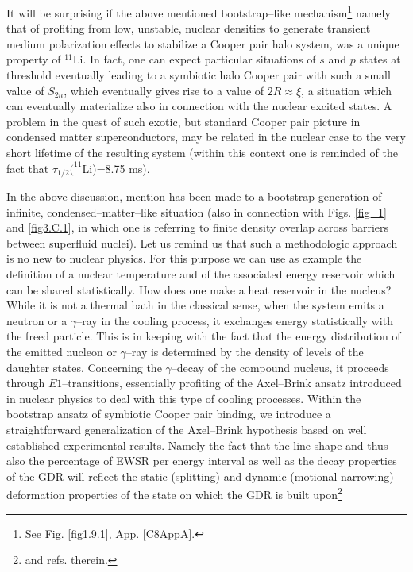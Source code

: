 It will be surprising if the above mentioned  bootstrap--like mechanism\footnote{See Fig. \ref{fig1.9.1}, App. \ref{C8AppA}.}  namely that of profiting from  low, unstable, nuclear densities to generate transient medium polarization effects to stabilize a Cooper pair halo system, was a unique property of $^{11}$Li. In fact, one can expect particular situations of $s$ and $p$ states at threshold eventually leading to a symbiotic halo Cooper pair with such a small value of $S_{2n}$, which  eventually gives rise to a value of $2R\approx\xi$, a situation which can eventually materialize also in connection with the nuclear excited states. A problem in the quest of such exotic, but standard Cooper pair picture in condensed matter superconductors, may be related in the nuclear case to the very short lifetime of the resulting system (within this context one is reminded of the fact that $\tau_{1/2}(^{11}$Li)=8.75 ms).


In the above discussion, mention has been made to a bootstrap generation of infinite, condensed--matter--like situation (also  in connection with Figs. \ref{fig_1} and \ref{fig3.C.1}, in which one is referring to finite density overlap across barriers between superfluid nuclei). Let us remind us that such a methodologic approach is no new to nuclear physics. For this purpose we can use as example the definition of a nuclear temperature and of the associated energy reservoir which can be shared statistically. How does one make a heat reservoir in the nucleus? While it is not a thermal bath in the classical sense, when the system emits a neutron or a $\gamma$--ray in the cooling process, it exchanges energy statistically with the freed particle. This is in keeping with the fact that the energy distribution of the emitted nucleon or $\gamma$--ray is determined by the density of levels of the daughter states. Concerning the $\gamma$--decay of the compound nucleus, it proceeds through $E1$--transitions, essentially profiting of the Axel--Brink ansatz introduced in nuclear physics to deal with this type of cooling processes.
Within the bootstrap ansatz of symbiotic Cooper pair binding, we introduce a straightforward generalization of the Axel--Brink hypothesis based on  well established experimental    results. Namely the fact that the line shape and thus also the percentage of EWSR per energy interval as well as the decay properties of the GDR will reflect the static (splitting) and dynamic (motional narrowing) deformation properties of the state on which the GDR is built upon\footnote{\cite{LeTourneaux:65,Bohr:75,Bortignon:98} and refs. therein.}


